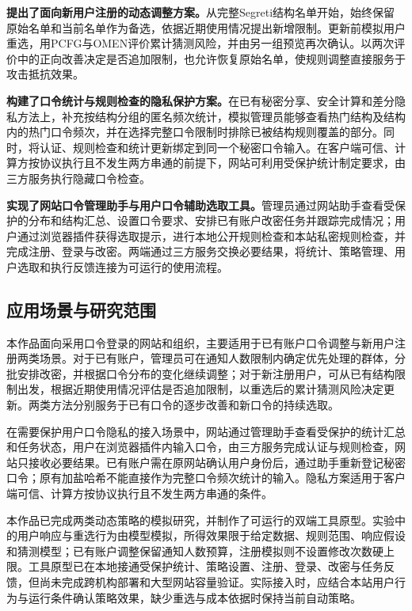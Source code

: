 \documentclass{crypto_report}
\begin{document}
\textbf{提出了面向新用户注册的动态调整方案。}从完整Segreti结构名单开始，始终保留原始名单和当前名单作为备选，依据近期使用情况提出新增限制。更新前模拟用户重选，用PCFG与OMEN评价累计猜测风险，并由另一组预览再次确认。以两次评价中的正向改善决定是否追加限制，也允许恢复原始名单，使规则调整直接服务于攻击抵抗效果。

\textbf{构建了口令统计与规则检查的隐私保护方案。}在已有秘密分享、安全计算和差分隐私方法上，补充按结构分组的匿名频次统计，模拟管理员能够查看热门结构及结构内的热门口令频次，并在选择完整口令限制时排除已被结构规则覆盖的部分。同时，将认证、规则检查和统计更新绑定到同一个秘密口令输入。在客户端可信、计算方按协议执行且不发生两方串通的前提下，网站可利用受保护统计制定要求，由三方服务执行隐藏口令检查。

\textbf{实现了网站口令管理助手与用户口令辅助选取工具。}管理员通过网站助手查看受保护的分布和结构汇总、设置口令要求、安排已有账户改密任务并跟踪完成情况；用户通过浏览器插件获得选取提示，进行本地公开规则检查和本站私密规则检查，并完成注册、登录与改密。两端通过三方服务交换必要结果，将统计、策略管理、用户选取和执行反馈连接为可运行的使用流程。
\subsection{应用场景与研究范围}\label{ux5e94ux7528ux573aux666fux4e0eux7814ux7a76ux8303ux56f4}

本作品面向采用口令登录的网站和组织，主要适用于已有账户口令调整与新用户注册两类场景。对于已有账户，管理员可在通知人数限制内确定优先处理的群体，分批安排改密，并根据口令分布的变化继续调整；对于新注册用户，可从已有结构限制出发，根据近期使用情况评估是否追加限制，以重选后的累计猜测风险决定更新。两类方法分别服务于已有口令的逐步改善和新口令的持续选取。

在需要保护用户口令隐私的接入场景中，网站通过管理助手查看受保护的统计汇总和任务状态，用户在浏览器插件内输入口令，由三方服务完成认证与规则检查，网站只接收必要结果。已有账户需在原网站确认用户身份后，通过助手重新登记秘密口令；原有加盐哈希不能直接作为完整口令频次统计的输入。隐私方案适用于客户端可信、计算方按协议执行且不发生两方串通的条件。

本作品已完成两类动态策略的模拟研究，并制作了可运行的双端工具原型。实验中的用户响应与重选行为由模型模拟，所得效果限于给定数据、规则范围、响应假设和猜测模型；已有账户调整保留通知人数预算，注册模拟则不设置修改次数硬上限。工具原型已在本地接通受保护统计、策略设置、注册、登录、改密与任务反馈，但尚未完成跨机构部署和大型网站容量验证。实际接入时，应结合本站用户行为与运行条件确认策略效果，缺少重选与成本依据时保持当前自动策略。
\clearpage
\end{document}
